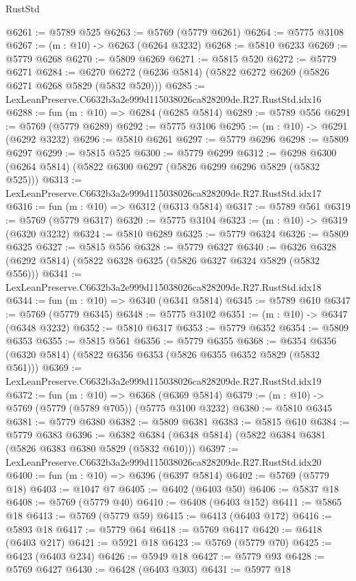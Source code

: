 \begin{lexlean}{RustStd}
\begin{coremodule}
@6261 := @5789 @525
@6263 := @5769 (@5779 @6261)
@6264 := @5775 @3108
@6267 := (m : @10) -> @6263 (@6264 @3232)
@6268 := @5810 @6233
@6269 := @5779 @6268
@6270 := @5809 @6269
@6271 := @5815 @520
@6272 := @5779 @6271
@6284 := @6270 @6272 (@6236 @5814) (@5822 @6272 @6269 (@5826 @6271 @6268 @5829 (@5832 @520)))
@6285 := LexLeanPreserve.C6632b3a2e999d115038026ca828209de.R27.RustStd.idx16
@6288 := fun (m : @10) => @6284 (@6285 @5814)
@6289 := @5789 @556
@6291 := @5769 (@5779 @6289)
@6292 := @5775 @3106
@6295 := (m : @10) -> @6291 (@6292 @3232)
@6296 := @5810 @6261
@6297 := @5779 @6296
@6298 := @5809 @6297
@6299 := @5815 @525
@6300 := @5779 @6299
@6312 := @6298 @6300 (@6264 @5814) (@5822 @6300 @6297 (@5826 @6299 @6296 @5829 (@5832 @525)))
@6313 := LexLeanPreserve.C6632b3a2e999d115038026ca828209de.R27.RustStd.idx17
@6316 := fun (m : @10) => @6312 (@6313 @5814)
@6317 := @5789 @561
@6319 := @5769 (@5779 @6317)
@6320 := @5775 @3104
@6323 := (m : @10) -> @6319 (@6320 @3232)
@6324 := @5810 @6289
@6325 := @5779 @6324
@6326 := @5809 @6325
@6327 := @5815 @556
@6328 := @5779 @6327
@6340 := @6326 @6328 (@6292 @5814) (@5822 @6328 @6325 (@5826 @6327 @6324 @5829 (@5832 @556)))
@6341 := LexLeanPreserve.C6632b3a2e999d115038026ca828209de.R27.RustStd.idx18
@6344 := fun (m : @10) => @6340 (@6341 @5814)
@6345 := @5789 @610
@6347 := @5769 (@5779 @6345)
@6348 := @5775 @3102
@6351 := (m : @10) -> @6347 (@6348 @3232)
@6352 := @5810 @6317
@6353 := @5779 @6352
@6354 := @5809 @6353
@6355 := @5815 @561
@6356 := @5779 @6355
@6368 := @6354 @6356 (@6320 @5814) (@5822 @6356 @6353 (@5826 @6355 @6352 @5829 (@5832 @561)))
@6369 := LexLeanPreserve.C6632b3a2e999d115038026ca828209de.R27.RustStd.idx19
@6372 := fun (m : @10) => @6368 (@6369 @5814)
@6379 := (m : @10) -> @5769 (@5779 (@5789 @705)) (@5775 @3100 @3232)
@6380 := @5810 @6345
@6381 := @5779 @6380
@6382 := @5809 @6381
@6383 := @5815 @610
@6384 := @5779 @6383
@6396 := @6382 @6384 (@6348 @5814) (@5822 @6384 @6381 (@5826 @6383 @6380 @5829 (@5832 @610)))
@6397 := LexLeanPreserve.C6632b3a2e999d115038026ca828209de.R27.RustStd.idx20
@6400 := fun (m : @10) => @6396 (@6397 @5814)
@6402 := @5769 (@5779 @18)
@6403 := @1047 @7
@6405 := @6402 (@6403 @50)
@6406 := @5837 @18
@6408 := @5769 (@5779 @40)
@6410 := @6408 (@6403 @152)
@6411 := @5865 @18
@6413 := @5769 (@5779 @59)
@6415 := @6413 (@6403 @172)
@6416 := @5893 @18
@6417 := @5779 @64
@6418 := @5769 @6417
@6420 := @6418 (@6403 @217)
@6421 := @5921 @18
@6423 := @5769 (@5779 @70)
@6425 := @6423 (@6403 @234)
@6426 := @5949 @18
@6427 := @5779 @93
@6428 := @5769 @6427
@6430 := @6428 (@6403 @303)
@6431 := @5977 @18

\end{coremodule}
\end{lexlean}
